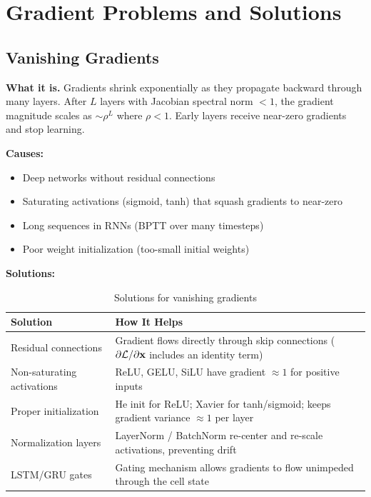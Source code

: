 \section{Gradient Problems and Solutions}
\label{sec:gradient_problems}

\subsection{Vanishing Gradients}

\textbf{What it is.} Gradients shrink exponentially as they propagate backward through many layers. After $L$ layers with Jacobian spectral norm $< 1$, the gradient magnitude scales as $\sim \rho^L$ where $\rho < 1$. Early layers receive near-zero gradients and stop learning.

\textbf{Causes:}
\begin{itemize}
    \item Deep networks without residual connections
    \item Saturating activations (sigmoid, tanh) that squash gradients to near-zero
    \item Long sequences in RNNs (BPTT over many timesteps)
    \item Poor weight initialization (too-small initial weights)
\end{itemize}

\textbf{Solutions:}

\begin{table}[H]
\centering
\caption{Solutions for vanishing gradients}
\begin{tabularx}{\textwidth}{lX}
\toprule
\textbf{Solution} & \textbf{How It Helps} \\
\midrule
Residual connections & Gradient flows directly through skip connections ($\partial \mathcal{L} / \partial \mathbf{x}$ includes an identity term) \\
Non-saturating activations & ReLU, GELU, SiLU have gradient $\approx 1$ for positive inputs \\
Proper initialization & He init for ReLU; Xavier for tanh/sigmoid; keeps gradient variance $\approx 1$ per layer \\
Normalization layers & LayerNorm / BatchNorm re-center and re-scale activations, preventing drift \\
LSTM/GRU gates & Gating mechanism allows gradients to flow unimpeded through the cell state \\
\bottomrule
\end{tabularx}
\end{table}

